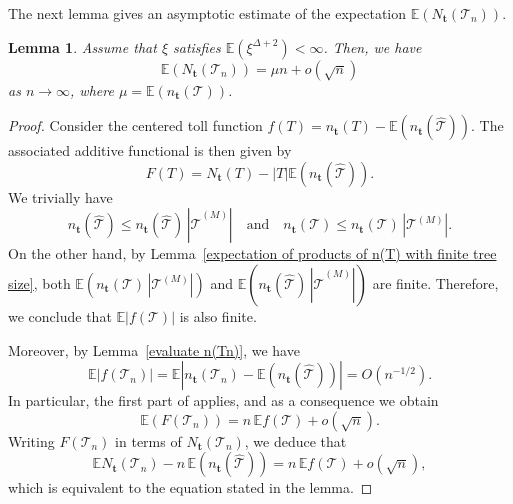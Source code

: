 \documentclass[article]{amsart}
\newcommand{\tc}{\mathcal{T}}
\newcommand{\htc}{\hat{\tc}}
\newcommand{\st}{\textbf{t}}
\newcommand{\N}{N_{\st}}
\newcommand{\n}{n_{\st}}
\newcommand{\E}{\mathbb{E}}
\newtheorem{lemma}[theorem]{Lemma}
\theoremstyle{definition}
\theoremstyle{remark}
\begin{document}
The next lemma gives an asymptotic estimate of the expectation $\mathbb{E}(\N(\tc_n))$.
\begin{lemma}\label{expectation of Nt}
	Assume that $\xi$ satisfies $\mathbb{E}(\xi^{\Delta+2})<\infty$. Then, we have
	\[\mathbb{E}(\N(\tc_n)) =\mu n +o(\sqrt{n})\]
 as $n\to\infty$, where $\mu=\E (\n(\tc))$.
\end{lemma}
\begin{proof}
Consider the centered toll function \( f(T) = \n(T) - \E(\n(\htc)) \). The associated additive functional is then given by
\[
F(T) = \N(T) - |T| \E(\n(\htc)).
\]
We trivially have
\[
\n(\htc) \leq \n(\htc)\,|\htc^{(M)}| \quad \text{and} \quad \n(\tc) \leq \n(\tc)\,|\tc^{(M)}|.
\]
On the other hand, by Lemma~\ref{expectation of products of n(T) with finite tree size}, both \( \E(\n(\tc)\,|\tc^{(M)}|) \) and \( \E(\n(\htc)\,|\htc^{(M)}|) \) are finite. Therefore, we conclude that \( \E|f(\tc)| \) is also finite.

\medskip
Moreover, by Lemma~\ref{evaluate n(Tn)}, we have
\begin{equation} \label{lkkljdk}
\E\left|f(\tc_n)\right| = \E\left|\n(\tc_n) - \E(\n(\htc))\right| = O(n^{-1/2}).
\end{equation}
In particular, the first part of \cite[Theorem~1.5]{J16} applies, and as a consequence we obtain
\[
\E\left(F(\tc_n)\right) = n\, \E f(\tc) + o(\sqrt{n}).
\]
Writing \( F(\tc_n) \) in terms of \( \N(\tc_n) \), we deduce that
\[
\E \N(\tc_n) - n\, \E(\n(\htc)) = n\, \E f(\tc) + o(\sqrt{n}),
\]
which is equivalent to the equation stated in the lemma.
\end{proof}
\end{document}
